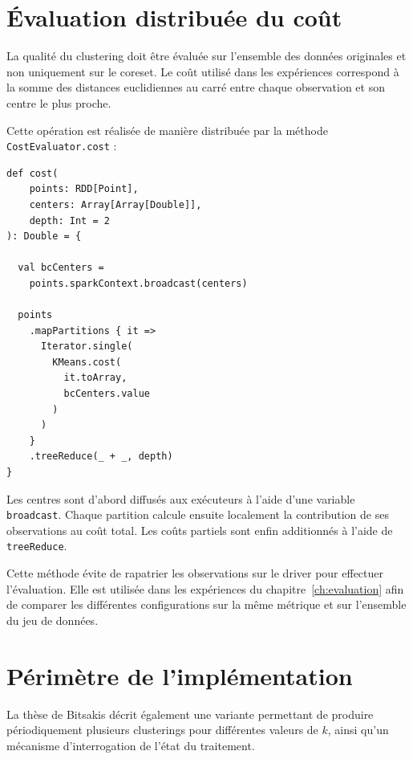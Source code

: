 \section{Évaluation distribuée du coût}
\label{sec:impl-evaluation}

La qualité du clustering doit être évaluée sur l'ensemble des données originales et non uniquement sur le coreset. Le coût utilisé dans les expériences correspond à la somme des distances euclidiennes au carré entre chaque observation et son centre le plus proche.

Cette opération est réalisée de manière distribuée par la méthode \texttt{CostEvaluator.cost} :

\begin{verbatim}
def cost(
    points: RDD[Point],
    centers: Array[Array[Double]],
    depth: Int = 2
): Double = {

  val bcCenters =
    points.sparkContext.broadcast(centers)

  points
    .mapPartitions { it =>
      Iterator.single(
        KMeans.cost(
          it.toArray,
          bcCenters.value
        )
      )
    }
    .treeReduce(_ + _, depth)
}
\end{verbatim}

Les centres sont d'abord diffusés aux exécuteurs à l'aide d'une variable \texttt{broadcast}. Chaque partition calcule ensuite localement la contribution de ses observations au coût total. Les coûts partiels sont enfin additionnés à l'aide de \texttt{treeReduce}.

Cette méthode évite de rapatrier les observations sur le driver pour effectuer l'évaluation. Elle est utilisée dans les expériences du chapitre~\ref{ch:evaluation} afin de comparer les différentes configurations sur la même métrique et sur l'ensemble du jeu de données.

\section{Périmètre de l'implémentation}

La thèse de Bitsakis décrit également une variante permettant de produire périodiquement plusieurs clusterings pour différentes valeurs de \(k\), ainsi qu'un mécanisme d'interrogation de l'état du traitement.

